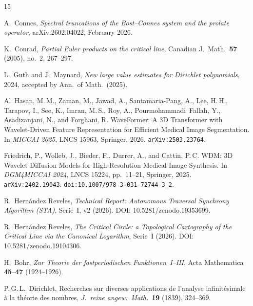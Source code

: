 \documentclass[11pt]{amsart}
\begin{document}
\begin{thebibliography}{15}

A.~Connes,
\textit{Spectral truncations of the Bost--Connes system and the prolate
operator},
arXiv:2602.04022, February 2026.

K.~Conrad,
\textit{Partial Euler products on the critical line},
Canadian J.\ Math.\ \textbf{57} (2005), no.~2, 267--297.

L.~Guth and J.~Maynard,
\textit{New large value estimates for Dirichlet polynomials},
2024, accepted by Ann.\ of Math.\ (2025).

Al~Hasan, M.\,M., Zaman, M., Jawad, A., Santamaria-Pang, A.,
Lee, H.\,H., Tarapov, I., See, K., Imran, M.\,S., Roy, A.,
Pourmohammadi~Fallah, Y., Asadizanjani, N., and Forghani, R.
WaveFormer: A 3D Transformer with Wavelet-Driven Feature
Representation for Efficient Medical Image Segmentation.
In \textit{MICCAI 2025}, LNCS 15963, Springer, 2026.
\texttt{arXiv:2503.23764}.

Friedrich, P., Wolleb, J., Bieder, F., Durrer, A., and Cattin, P.\,C.
WDM: 3D Wavelet Diffusion Models for High-Resolution Medical
Image Synthesis.
In \textit{DGM4MICCAI 2024}, LNCS 15224, pp.\ 11--21, Springer, 2025.
\texttt{arXiv:2402.19043}.
\texttt{doi:10.1007/978-3-031-72744-3\_2}.

R.~Hern\'andez Reveles,
\emph{Technical Report: Autonomous Traversal Synchrony Algorithm (STA)},
Serie~I, v2 (2026). DOI: 10.5281/zenodo.19353699.

R.~Hern\'andez Reveles,
\emph{The Critical Circle: a Topological Cartography of the Critical
  Line via the Canonical Logarithm},
Serie~I (2026). DOI: 10.5281/zenodo.19104306.

H.~Bohr,
\emph{Zur Theorie der fastperiodischen Funktionen~I--III},
Acta Mathematica \textbf{45}--\textbf{47} (1924--1926).

P.\,G.\,L.~Dirichlet,
Recherches sur diverses applications de l'analyse infinit\'esimale
\`a la th\'eorie des nombres,
\emph{J.\ reine angew.\ Math.}\ \textbf{19} (1839), 324--369.


\end{thebibliography}
\end{document}
